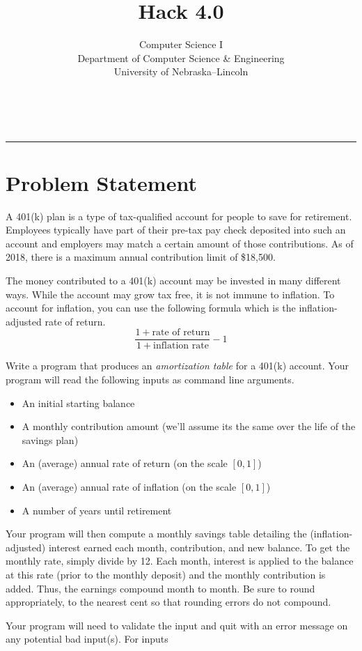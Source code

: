 \documentclass[12pt]{scrartcl}
\title{Hack 4.0}\let\Title\@title
\subtitle{Computer Science I\\
{\small
\vskip1cm
Department of Computer Science \& Engineering \\
University of Nebraska--Lincoln}
\vskip-1cm}
\date{~}
\begin{document}
\maketitle

\hrule



\section*{Problem Statement}

A 401(k) plan is a type of tax-qualified account for people to save 
for retirement.  Employees typically have part of their pre-tax pay
check deposited into such an account and employers may match a certain
amount of those contributions.  As of 2018, there is a maximum
annual contribution limit of \$18,500.
 
The money contributed to a 401(k) account may be invested in many
different ways.  While the account may grow tax free, it is not 
immune to inflation.  To account for inflation, you can use
the following formula which is the inflation-adjusted rate of
return.
  $$\frac{1 + \textrm{rate of return}}{1+\textrm{inflation rate}} - 1$$

Write a program that produces an \emph{amortization table} for a
401(k) account.  Your program will read the following inputs as 
command line arguments.
\begin{itemize}
  \item An initial starting balance
  \item A monthly contribution amount (we'll assume its the same over the life of the savings plan)
  \item An (average) annual rate of return (on the scale $[0, 1]$)
  \item An (average) annual rate of inflation (on the scale $[0, 1]$)
  \item A number of years until retirement
\end{itemize}
Your program will then compute a monthly savings table detailing
the (inflation-adjusted) interest earned each month, contribution, and
new balance.  To get the monthly rate, simply divide by 12.  Each month, 
interest is applied to the balance at this rate (prior to the monthly 
deposit) and the monthly contribution is added.  Thus, the earnings 
compound month to month.  Be sure to round appropriately, to the nearest
cent so that rounding errors do not compound.

Your program will need to validate the input and quit with an error
message on any potential bad input(s).  For inputs 
\end{document}
